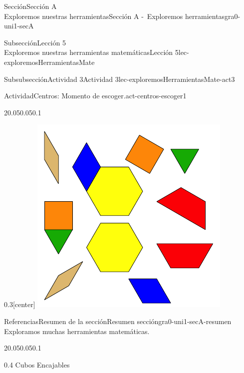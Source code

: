 \begin{sectionptx}{Sección}{{\Large Sección A\\}Exploremos nuestras herramientas}{}{Sección A -~Exploremos herramientas}{}{}{gra0-uni1-secA}
\begin{subsectionptx}{Subsección}{{\normalsize Lección 5\\[-0.05cm]}Exploremos nuestras herramientas matemáticas}{}{Lección 5}{}{}{lec-exploremosHerramientasMate}
\begin{subsubsectionptx}{Subsubsección}{Actividad 3}{}{Actividad 3}{}{}{lec-exploremosHerramientasMate-act3}
\begin{activity}{Actividad}{Centros: Momento de escoger.}{act-centros-escoger1}
\begin{sidebyside}{2}{0.05}{0.05}{0.1}
\begin{sbspanel}{0.3}[center]
\includegraphics[max width=\linewidth, center]{external/svg-source/tikz-file-147344.pdf}
\end{sbspanel}%
\end{sidebyside}%
\end{activity}%
\end{subsubsectionptx}
\end{subsectionptx}
%
%
\typeout{************************************************}
\typeout{************************************************}
%
\begin{references-subsection}{Referencias}{Resumen de la sección}{}{Resumen sección}{}{}{gra0-uni1-secA-resumen}
Exploramos muchas herramientas matemáticas.%
\begin{sidebyside}{2}{0.05}{0.05}{0.1}%
\begin{sbspanel}{0.4}%
Cubos Encajables%
\par

\end{sbspanel}
\end{sidebyside}
\end{references-subsection}
\end{sectionptx}
